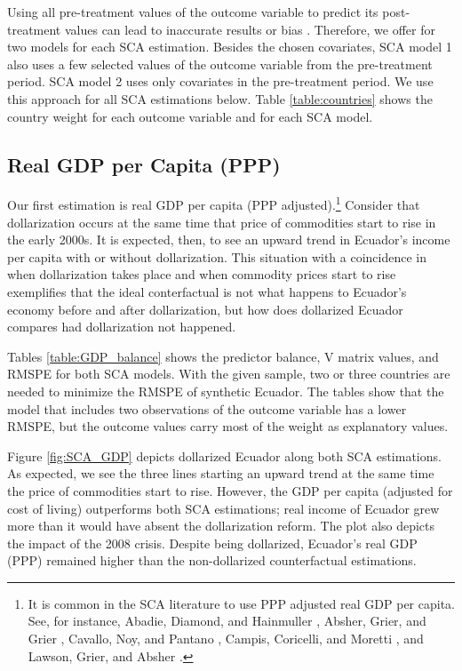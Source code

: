 \documentclass[12pt]{article}
\begin{document}


Using all pre-treatment values of the outcome variable to predict its post-treatment values can lead to inaccurate results or bias \parencite{Ashok2015}. Therefore, we offer for two models for each SCA estimation. Besides the chosen covariates, SCA model 1 also uses a few selected values of the outcome variable from the pre-treatment period. SCA model 2 uses only covariates in the pre-treatment period. We use this approach for all SCA estimations below. Table \ref{table:countries} shows the country weight for each outcome variable and for each SCA model.



\subsection{Real GDP per Capita (PPP)}

Our first estimation is real GDP per capita (PPP adjusted).\footnote{It is common in the SCA literature to use PPP adjusted real GDP per capita. See, for instance, Abadie, Diamond, and Hainmuller \parencite*{Abadie2015}, Absher, Grier, and Grier \parencite*{Absher2020}, Cavallo, Noy, and Pantano \parencite*{Cavallo2013}, Campis, Coricelli, and Moretti \parencite*{Campos2019}, and Lawson, Grier, and Absher \parencite*{Lawson2019}.} Consider that dollarization occurs at the same time that price of commodities start to rise in the early 2000s. It is expected, then, to see an upward trend in Ecuador's income per capita with or without dollarization. This situation with a coincidence in when dollarization takes place and when commodity prices start to rise exemplifies that the ideal conterfactual is not what happens to Ecuador's economy before and after dollarization, but how does dollarized Ecuador compares had dollarization not happened. 

Tables \ref{table:GDP_balance} shows the predictor balance, V matrix values, and RMSPE for both SCA models. With the given sample, two or three countries are needed to minimize the RMSPE of synthetic Ecuador. The tables show that the model that includes two observations of the outcome variable has a lower RMSPE, but the outcome values carry most of the weight as explanatory values.



Figure \ref{fig:SCA_GDP} depicts dollarized Ecuador along both SCA estimations. As expected, we see the three lines starting an upward trend at the same time the price of commodities start to rise. However, the GDP per capita (adjusted for cost of living) outperforms both SCA estimations; real income of Ecuador grew more than it would have absent the dollarization reform. The plot also depicts the impact of the 2008 crisis. Despite being dollarized, Ecuador's real GDP (PPP) remained higher than the non-dollarized counterfactual estimations.
\end{document}
